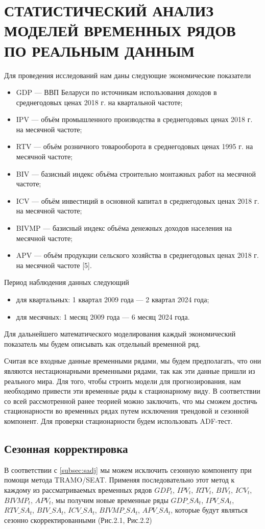 \documentclass[a4paper, 14pt]{extreport}
\numberwithin{equation}{subsection}
\numberwithin{equation}{section}
\begin{document}
	\newpage
	\chapter{СТАТИСТИЧЕСКИЙ АНАЛИЗ МОДЕЛЕЙ ВРЕМЕННЫХ РЯДОВ ПО РЕАЛЬНЫМ ДАННЫМ}
	Для проведения исследований нам даны следующие экономические показатели
	\begin{itemize}
		\item GDP — ВВП Беларуси по источникам использования доходов в среднегодовых ценах 2018 г. на квартальной частоте;
		\item IPV — объём промышленного производства в среднегодовых ценах 2018
		г. на месячной частоте;
		\item RTV — объём розничного товарооборота в среднегодовых ценах 1995 г.
		на месячной частоте;
		\item BIV — базисный индекс объёма строительно монтажных работ на месячной частоте;
		\item ICV — объём инвестиций в основной капитал в среднегодовых ценах 2018
		г. на месячной частоте;
		\item BIVMP — базисный индекс объёма денежных доходов населения на месячной частоте;
		\item APV — объём продукции сельского хозяйства в среднегодовых ценах 2018
		г. на месячной частоте [5].
	\end{itemize}
	
	Период наблюдения данных следующий
	\begin{itemize}
		\item для квартальных: 1 квартал 2009 года — 2 квартал 2024 года;
		\item для месячных: 1 месяц 2009 года — 6 месяц 2024 года.
	\end{itemize}
	
	Для дальнейшего математического моделирования каждый экономический показатель мы будем описывать как отдельный временной ряд.
	
	Считая все входные данные временными рядами, мы будем предполагать, что они являются нестационарными временными рядами, так как эти данные пришли из реального мира. Для того, чтобы строить модели для прогнозирования, нам необходимо привести эти временные ряды к стационарному виду. В соответствии со всей рассмотренной ранее теорией можно заключить, что мы сможем достичь стационарности во временных рядах путем исключения трендовой и сезонной компонент. Для проверки стационарности будем использовать ADF-тест.
	
	\section{Сезонная корректировка}
	В соответствии с \ref{subsec:sadj} мы можем исключить сезонную компоненту при помощи метода TRAMO/SEAT.
	Применяя последовательно этот метод к каждому из рассматриваемых временных рядов $GDP_t$, $IPV_t$, $RTV_t$, $BIV_t$, $ICV_t$, $BIVMP_t$, $APV_t$, мы получим новые временные ряды $GDP\_SA_t$, $IPV\_SA_t$, $RTV\_SA_t$, $BIV\_SA_t$, $ICV\_SA_t$, $BIVMP\_SA_t$, $APV\_SA_t$, которые будут являться сезонно скорректированными (Рис.2.1, Рис.2.2)
	
\end{document}
